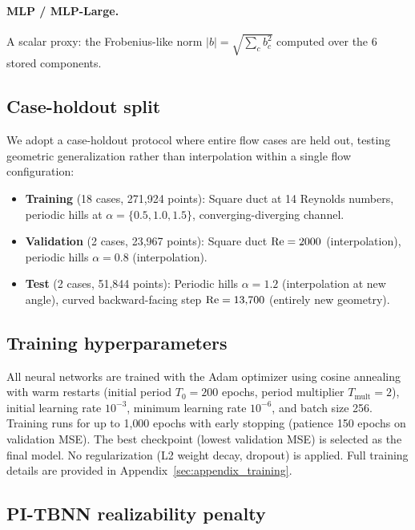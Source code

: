 \paragraph{MLP / MLP-Large.} A scalar proxy: the Frobenius-like norm $|b| = \sqrt{\sum_c b_c^2}$ computed over the 6 stored components.

\subsection{Case-holdout split}

We adopt a case-holdout protocol where entire flow cases are held out, testing geometric generalization rather than interpolation within a single flow configuration:

\begin{itemize}
    \item \textbf{Training} (18 cases, 271{,}924 points): Square duct at 14 Reynolds numbers, periodic hills at $\alpha = \{0.5, 1.0, 1.5\}$, converging-diverging channel.
    \item \textbf{Validation} (2 cases, 23{,}967 points): Square duct $\mathrm{Re} = 2000$ (interpolation), periodic hills $\alpha = 0.8$ (interpolation).
    \item \textbf{Test} (2 cases, 51{,}844 points): Periodic hills $\alpha = 1.2$ (interpolation at new angle), curved backward-facing step $\mathrm{Re} = 13{,}700$ (entirely new geometry).
\end{itemize}

\subsection{Training hyperparameters}

All neural networks are trained with the Adam optimizer \citep{Kingma2015} using cosine annealing with warm restarts (initial period $T_0 = 200$ epochs, period multiplier $T_{\mathrm{mult}} = 2$), initial learning rate $10^{-3}$, minimum learning rate $10^{-6}$, and batch size 256.
Training runs for up to 1{,}000 epochs with early stopping (patience 150 epochs on validation MSE).
The best checkpoint (lowest validation MSE) is selected as the final model.
No regularization (L2 weight decay, dropout) is applied.
Full training details are provided in Appendix~\ref{sec:appendix_training}.

\subsection{PI-TBNN realizability penalty}

